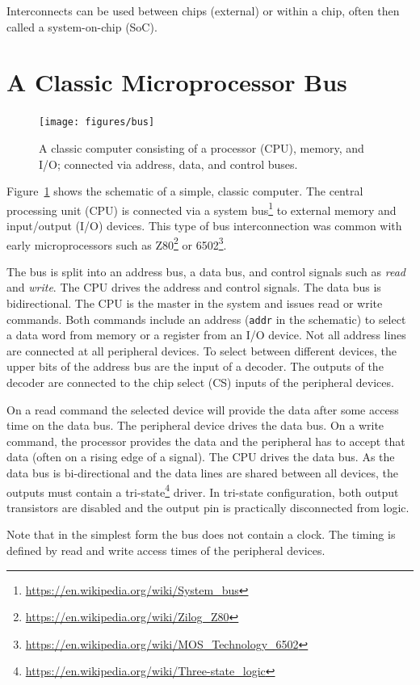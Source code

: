 \documentclass[%
    10pt,
    headinclude, footexclude,
    openright, %
    notitlepage,
    cleardoubleempty,
    headsepline,
    pointlessnumbers,
    bibtotoc, idxtotoc,
    ]{scrbook}
\newcommand{\code}[1]{{\lstinline[basicstyle=\small\ttfamily]{#1}}}
\newcommand{\myref}[2]{\href{#1}{#2}}
\renewcommand{\myref}[2]{{#2}{\footnote{\url{#1}}}}
\begin{document}
Interconnects can be used between chips (external) or within a chip, often
then called a system-on-chip (SoC).

\section{A Classic Microprocessor Bus}
\label{sect:bus}

\begin{figure}
  \centering
  \texttt{[image: figures/bus]}
  \caption{A classic computer consisting of a processor (CPU), memory, and I/O;
  connected via address, data, and control buses.}
  \label{fig:bus}
\end{figure}

Figure~\ref{fig:bus} shows the schematic of a simple, classic computer.
The central processing unit (CPU) is connected via a
\myref{https://en.wikipedia.org/wiki/System_bus}{system bus} to
external memory and input/output (I/O) devices.
This type of bus interconnection was common with early microprocessors
such as \myref{https://en.wikipedia.org/wiki/Zilog_Z80}{Z80} or
\myref{https://en.wikipedia.org/wiki/MOS_Technology_6502}{6502}.

The bus is split into an address bus, a data bus, and control signals
such as \emph{read} and \emph{write}.
The CPU drives the address and control signals. The data bus is bidirectional.
The CPU is the master in the system and issues read or write commands.
Both commands include an address (\code{addr} in the schematic) to select
a data word from memory or a register from an I/O device.
Not all address lines are connected at all peripheral devices.
To select between different devices, the upper bits of the address bus are the
input of a decoder. The outputs of the decoder are connected to the chip select (CS)
inputs of the peripheral devices.

On a read command the selected device will provide the data after some access time
on the data bus. The peripheral device drives the data bus.
On a write command, the processor provides the data and the peripheral has to
accept that data (often on a rising edge of a signal). The CPU drives the data bus.
As the data bus is bi-directional and the data lines are shared between all devices,
the outputs must contain a \myref{https://en.wikipedia.org/wiki/Three-state_logic}{tri-state}
driver. In tri-state configuration, both output transistors are disabled and the output pin
is practically disconnected from logic.

Note that in the simplest form the bus does not contain a clock. The timing is defined by
read and write access times of the peripheral devices.
\end{document}
